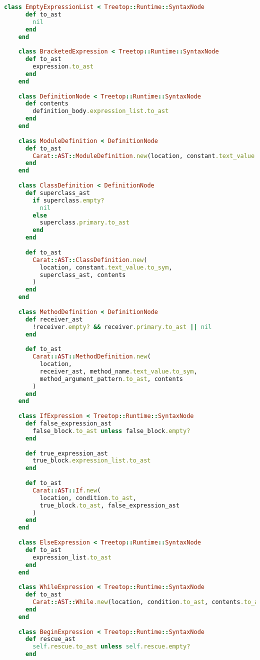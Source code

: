 \begin{lstlisting}[title={\small\Helvetica parser/nodes.rb},language=Ruby]
    class EmptyExpressionList < Treetop::Runtime::SyntaxNode
      def to_ast
        nil
      end
    end
    
    class BracketedExpression < Treetop::Runtime::SyntaxNode
      def to_ast
        expression.to_ast
      end
    end
    
    class DefinitionNode < Treetop::Runtime::SyntaxNode
      def contents
        definition_body.expression_list.to_ast
      end
    end
    
    class ModuleDefinition < DefinitionNode
      def to_ast
        Carat::AST::ModuleDefinition.new(location, constant.text_value.to_sym, contents)
      end
    end
    
    class ClassDefinition < DefinitionNode
      def superclass_ast
        if superclass.empty?
          nil
        else
          superclass.primary.to_ast
        end
      end
      
      def to_ast
        Carat::AST::ClassDefinition.new(
          location, constant.text_value.to_sym,
          superclass_ast, contents
        )
      end
    end
    
    class MethodDefinition < DefinitionNode
      def receiver_ast
        !receiver.empty? && receiver.primary.to_ast || nil
      end
      
      def to_ast
        Carat::AST::MethodDefinition.new(
          location,
          receiver_ast, method_name.text_value.to_sym,
          method_argument_pattern.to_ast, contents
        )
      end
    end
    
    class IfExpression < Treetop::Runtime::SyntaxNode
      def false_expression_ast
        false_block.to_ast unless false_block.empty?
      end
      
      def true_expression_ast
        true_block.expression_list.to_ast
      end
    
      def to_ast
        Carat::AST::If.new(
          location, condition.to_ast,
          true_block.to_ast, false_expression_ast
        )
      end
    end
    
    class ElseExpression < Treetop::Runtime::SyntaxNode
      def to_ast
        expression_list.to_ast
      end
    end
    
    class WhileExpression < Treetop::Runtime::SyntaxNode
      def to_ast
        Carat::AST::While.new(location, condition.to_ast, contents.to_ast)
      end
    end
    
    class BeginExpression < Treetop::Runtime::SyntaxNode
      def rescue_ast
        self.rescue.to_ast unless self.rescue.empty?
      end
    

\end{lstlisting}
